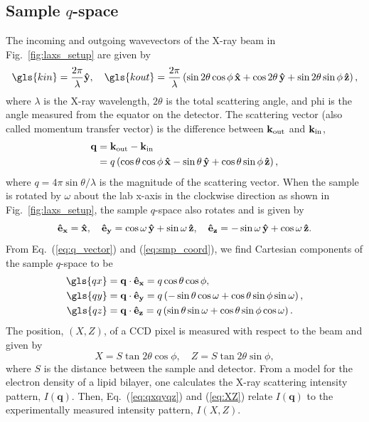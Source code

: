 \subsection{Sample $q$-space}\label{sec:sample_q-space}
The incoming and outgoing wavevectors of the X-ray beam in Fig.~\ref{fig:laxs_setup}
are given by
\begin{equation}
  \gls{kin} = \frac{2\pi}{\lambda} \yhat, \quad
  \gls{kout} = 
    \frac{2\pi}{\lambda} \left( 
      \sin 2\theta \cos\phi \, \xhat
      + \cos 2\theta \, \yhat
      + \sin 2\theta \sin\phi \, \zhat 
    \right),
\end{equation}
where $\lambda$ is the X-ray wavelength, $2\theta$ is the total scattering
angle, and \gls{phi} is the angle measured from the equator on the detector. 
The scattering vector (also called
momentum transfer vector) is
the difference between $\mathbf{k}_{\mathrm{out}}$ and $\mathbf{k}_{\mathrm{in}}$,
\begin{align}
  \mathbf{q} &= \mathbf{k}_{\mathrm{out}} - \mathbf{k}_{\mathrm{in}} \nonumber \\
             &= q \left( 
                  \cos\theta\cos\phi \, \mathbf{\hat{x}} - \sin\theta \, \mathbf{\hat{y}}
                  + \cos\theta\sin\phi \, \mathbf{\hat{z}}
                \right),
  \label{eq:q_vector}
\end{align}
where $q=4\pi\sin\theta/\lambda$ is the magnitude of the scattering vector. 
When the sample is rotated by $\omega$ about the lab x-axis in the clockwise 
direction as shown in Fig.~\ref{fig:laxs_setup}, the sample $q$-space also 
rotates and 
is given by  
\begin{equation}
  \mathbf{\hat{e}_x} = \mathbf{\hat{x}}, \quad
  \mathbf{\hat{e}_y} = \cos\omega\,\mathbf{\hat{y}} + \sin\omega\,\mathbf{\hat{z}}, \quad
  \mathbf{\hat{e}_z} = -\sin\omega\,\mathbf{\hat{y}} + \cos\omega\,\mathbf{\hat{z}}.
  \label{eq:smp_coord}
\end{equation}
From Eq.~(\ref{eq:q_vector}) and (\ref{eq:smp_coord}), we find Cartesian
components of the sample $q$-space to be
\begin{align}
  \gls{qx} &= \mathbf{q}\cdot\mathbf{\hat{e}_x} 
       = q\cos\theta\cos\phi, 
       \nonumber\\
  \gls{qy} &= \mathbf{q}\cdot\mathbf{\hat{e}_y} 
       = q\left(-\sin\theta\cos\omega + \cos\theta\sin\phi\sin\omega\right), 
       \nonumber\\
  \gls{qz} &= \mathbf{q}\cdot\mathbf{\hat{e}_z} 
       = q\left(\sin\theta\sin\omega + \cos\theta\sin\phi\cos\omega\right).
       \label{eq:qxqyqz}
\end{align}
The position, $(X,Z)$, of a CCD pixel is measured with respect to the beam 
and given by
\begin{equation}
  X = S \tan 2\theta \cos\phi, \quad Z = S \tan 2\theta \sin\phi,
  \label{eq:XZ}
\end{equation} 
where $S$ is the distance between the sample and detector.
From a model for the electron density of a lipid bilayer, one calculates
the X-ray scattering intensity pattern, $I(\mathbf{q})$. Then, Eq.~(\ref{eq:qxqyqz})
and (\ref{eq:XZ}) relate $I(\mathbf{q})$ to the experimentally measured
intensity pattern, $I(X,Z)$. 

